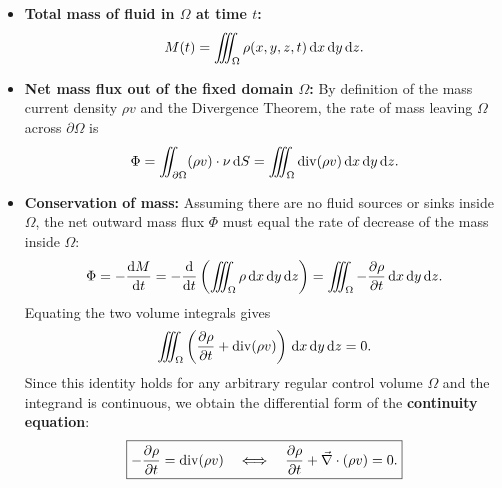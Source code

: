 \begin{itemize}
    \item \textbf{Total mass of fluid in $\Omega$ at time $t$:}
    \[
        M(t) = \iiint_{\Omega} \rho(x,y,z,t) \,\mathrm{d}x\,\mathrm{d}y\,\mathrm{d}z.
    \]
    \item \textbf{Net mass flux out of the fixed domain $\Omega$:} By definition of the mass current density $\rho v$ and the Divergence Theorem, the rate of mass leaving $\Omega$ across $\partial\Omega$ is
    \[
        \Phi = \iint_{\partial\Omega} (\rho v) \cdot \nu \,\mathrm{d}S = \iiint_{\Omega} \operatorname{div}(\rho v) \,\mathrm{d}x\,\mathrm{d}y\,\mathrm{d}z.
    \]
    \item \textbf{Conservation of mass:} Assuming there are no fluid sources or sinks inside $\Omega$, the net outward mass flux $\Phi$ must equal the rate of decrease of the mass inside $\Omega$:
    \[
        \Phi = -\frac{\dd M}{\dd t} = -\frac{\dd}{\dd t} \left( \iiint_{\Omega} \rho \dx\dy\dz \right) = \iiint_{\Omega} -\pdv{\rho}{t} \dx\dy\dz.
    \]
    Equating the two volume integrals gives
    \[
        \iiint_{\Omega} \left( \pdv{\rho}{t} + \operatorname{div}(\rho v) \right) \dx\dy\dz = 0.
    \]
    Since this identity holds for any arbitrary regular control volume $\Omega$ and the integrand is continuous, we obtain the differential form of the \textbf{continuity equation}:
    \[
        \boxed{-\pdv{\rho}{t} = \operatorname{div}(\rho v) \quad \Longleftrightarrow \quad \pdv{\rho}{t} + \dive(\rho v) = 0.}
    \]
\end{itemize}